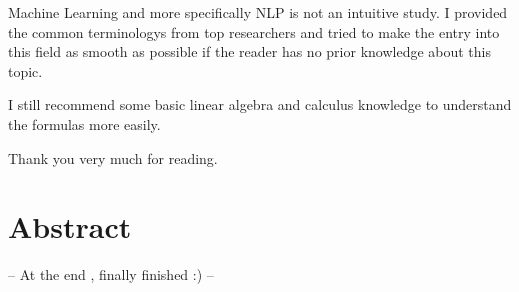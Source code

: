 Machine Learning and more specifically NLP is not an intuitive study. I provided the common terminologys from top researchers and tried to make the entry into this field as smooth as possible if the reader has no prior knowledge about this topic.

I still recommend some basic linear algebra and calculus knowledge to understand the formulas more easily.

Thank you very much for reading.

\newpage

\section*{Abstract}
\label{sec:abstract}

-- At the end , finally finished :) --